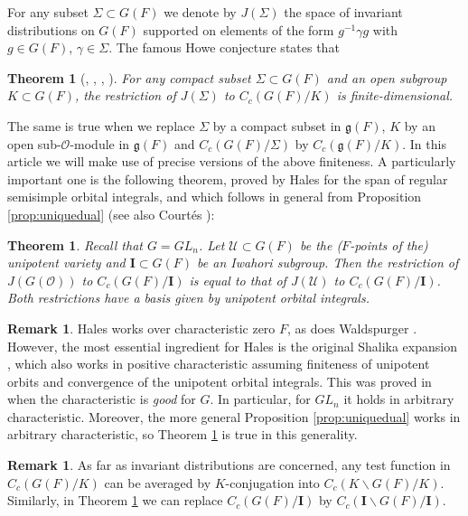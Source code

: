 \documentclass{amsart}
\numberwithin{equation}{section}
\newtheorem{theorem}[lemma]{Theorem}%
\theoremstyle{definition}
\newtheorem{remark}[lemma]{Remark}%
\newcommand{\cO}{\mathcal{O}}
\newcommand{\cU}{\mathcal{U}}
\newcommand{\fg}{\mathfrak{g}}
\newcommand{\bI}{\mathbf{I}}
\begin{document}
For any subset $\Sigma\subset G(F)$ we denote by $J(\Sigma)$ the space of invariant distributions on $G(F)$ supported on elements of the form $g^{-1}\gamma g$ with $g\in G(F)$, $\gamma\in\Sigma$. The famous Howe conjecture states that 

\begin{theorem}[\cite{H74}, \cite{HC}, \cite{C89}, \cite{BM00}] For any compact subset $\Sigma\subset G(F)$ and an open subgroup $K \subset G(F)$, the restriction of $J(\Sigma)$ to $C_c(G(F)/K)$ is finite-dimensional.
\end{theorem}

The same is true when we replace $\Sigma$ by a compact subset in $\fg(F)$, $K$ by an open sub-$\cO$-module in $\fg(F)$ and $C_c(G(F)/\Sigma)$ by $C_c(\fg(F)/K)$. In this article we will make use of precise versions of the above finiteness.
A particularly important one is the following theorem, proved by Hales \cite[Thm. 1]{Hales} for the span of regular semisimple orbital integrals, and which follows in general from Proposition \ref{prop:uniquedual} (see also Court\'{e}s \cite[Thm 1.10]{Cou06}):

\begin{theorem}
\label{thm:uni} 
Recall that $G=GL_n$. 
Let $\cU\subset G(F)$ be the ($F$-points of the) unipotent variety and $\bI\subset G(F)$ be an Iwahori subgroup. Then the restriction of $J(G(\cO))$ to $C_c(G(F)/\bI)$ is equal to that of $J(\cU)$ to $C_c(G(F)/\bI)$. Both restrictions have a basis given by unipotent orbital integrals.
\end{theorem}


\begin{remark}
\label{rmk:characteristic}
Hales \cite{Hales} works over characteristic zero $F$, as does Waldspurger \cite{W1, W2}. However, the most essential ingredient for Hales is the original Shalika expansion \cite{Shalika}, which also works in positive characteristic assuming finiteness of unipotent orbits and convergence of the unipotent orbital integrals. This was proved in \cite{McNinch} when the characteristic is {\em good} for $G$. In particular, for $GL_n$ it holds in arbitrary characteristic. Moreover, the more general Proposition \ref{prop:uniquedual} works in arbitrary characteristic, so Theorem \ref{thm:uni} is true in this generality.
\end{remark}

\begin{remark} As far as invariant distributions are concerned, any test function in $C_c(G(F)/K)$ can be averaged by $K$-conjugation into $C_c(K\backslash G(F)/K)$. Similarly, in Theorem \ref{thm:uni} we can replace $C_c(G(F)/\bI)$ by $C_c(\bI\backslash G(F)/\bI)$.
\end{remark}
\end{document}
